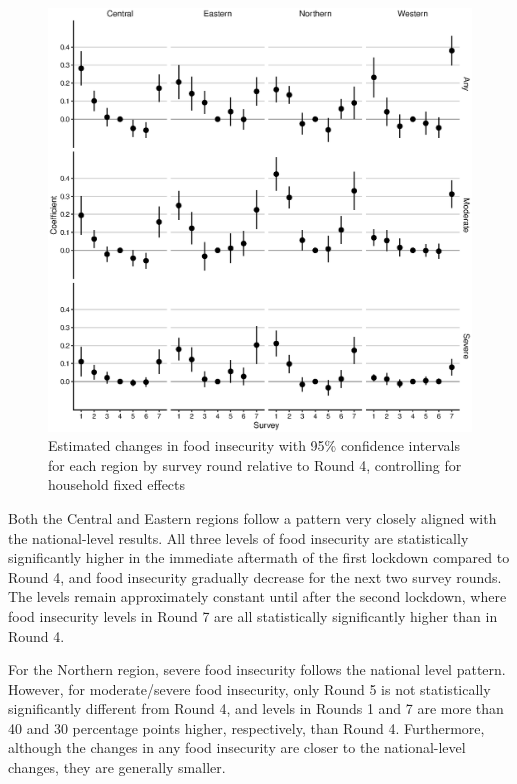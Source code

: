 \documentclass{wber}
\begin{document}
\begin{figure}
\caption{Estimated changes in food insecurity with 95\% confidence
intervals for each region by survey round relative to Round 4,
controlling for household fixed
effects}\label{fig:food_insecurity_region}
\begin{center}
\includegraphics[width=\linewidth, keepaspectratio]{./eps/fig_06.eps}
\end{center}
\end{figure}

Both the Central and Eastern regions follow a pattern very closely
aligned with the national-level results. All three levels of food
insecurity are statistically significantly higher in the immediate
aftermath of the first lockdown compared to Round 4, and food insecurity
gradually decrease for the next two survey rounds. The levels remain
approximately constant until after the second lockdown, where food
insecurity levels in Round 7 are all statistically significantly higher
than in Round 4.

For the Northern region, severe food insecurity follows the national
level pattern. However, for moderate/severe food insecurity, only Round
5 is not statistically significantly different from Round 4, and levels
in Rounds 1 and 7 are more than 40 and 30 percentage points higher,
respectively, than Round 4. Furthermore, although the changes in any
food insecurity are closer to the national-level changes, they are
generally smaller.
\end{document}
